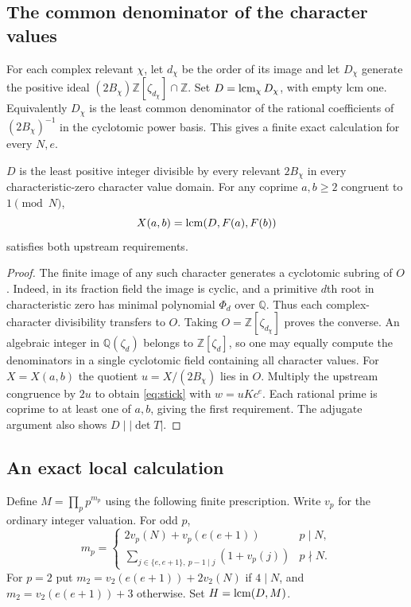 \subsection{The common denominator of the character values}
For each complex relevant $\chi$, let $d_\chi$ be the order of its image
and let $D_\chi$ generate the positive ideal
$(2B_\chi)\mathbb Z[\zeta_{d_\chi}]\cap\mathbb Z$.
Set $D=\mathop{\rm lcm}_\chi D_\chi$, with empty lcm one.
Equivalently $D_\chi$ is the least common denominator of the rational
coefficients of $(2B_\chi)^{-1}$ in the cyclotomic power basis. This gives a
finite exact calculation for every $N,e$.

\begin{proposition}
$D$ is the least positive integer divisible by every relevant $2B_\chi$ in
every characteristic-zero character value domain. For any coprime $a,b\ge2$
congruent to $1\pmod N$,
\[
             X(a,b)=\mathop{\rm lcm}(D,F(a),F(b))
\]
satisfies both upstream requirements.
\end{proposition}
\begin{proof}
The finite image of any such character generates a cyclotomic subring of
$O$. Indeed, in its fraction field the image is cyclic, and a primitive
$d$th root in characteristic zero has minimal polynomial $\Phi_d$ over
$\mathbb Q$. Thus each complex-character divisibility transfers to $O$.
Taking $O=\mathbb Z[\zeta_{d_\chi}]$ proves the converse. An algebraic
integer in $\mathbb Q(\zeta_d)$ belongs to $\mathbb Z[\zeta_d]$, so one
may equally compute the denominators in a single cyclotomic field containing
all character values.
For $X=X(a,b)$ the quotient $u=X/(2B_\chi)$ lies in $O$.
Multiply the upstream congruence by $2u$ to obtain \eqref{eq:stick} with
$w=uKc^e$. Each rational prime is coprime to at least one of $a,b$,
giving the first requirement. The adjugate argument also shows $D\mid|\det T|$.
\end{proof}

\subsection{An exact local calculation}
Define $M=\prod_p p^{m_p}$ using the following finite prescription.
Write $v_p$ for the ordinary integer valuation. For odd $p$,
\begin{equation}
m_p=\begin{cases}
2v_p(N)+v_p(e(e+1)) & p\mid N,\\
\displaystyle\sum_{j\in\{e,e+1\},\ p-1\mid j}(1+v_p(j)) & p\nmid N.
\end{cases}                                                    \label{eq:mp}
\end{equation}
For $p=2$ put $m_2=v_2(e(e+1))+2v_2(N)$ if $4\mid N$, and
$m_2=v_2(e(e+1))+3$ otherwise. Set $H=\mathop{\rm lcm}(D,M)$.

